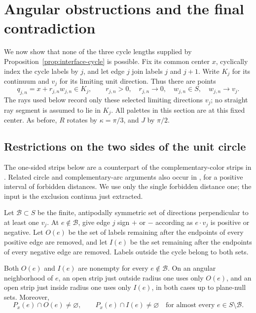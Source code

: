 \section{Angular obstructions and the final contradiction}
\label{sec:angular}

We now show that none of the three cycle lengths supplied by
Proposition~\ref{prop:interface-cycle} is possible.  Fix its common
center \(x\), cyclically index the cycle labels by \(j\), and let
edge \(j\) join labels \(j\) and \(j+1\).  Write \(K_j\) for its
continuum and \(v_j\) for its limiting unit direction.  Thus there
are points
\[
 q_{j,n}=x+r_{j,n}w_{j,n}\in K_j,\qquad
 r_{j,n}>0,\quad r_{j,n}\longrightarrow0,\quad
 w_{j,n}\in S,\quad w_{j,n}\longrightarrow v_j.
\]
The rays used below record only these selected limiting directions
\(v_j\); no straight ray segment is assumed to lie in \(K_j\).
All palettes in this section are at this fixed center.  As before,
\(R\) rotates by \(\kappa=\pi/3\), and \(J\) by \(\pi/2\).

\subsection{Restrictions on the two sides of the unit circle}

The one-sided strips below are a counterpart of the complementary-color
strips in \citet[Proposition~9]{SokolovVoronov2025}. Related circle and
complementary-arc arguments also occur in
\citet[Sections~3--5]{Voronov2025Interval}, for a positive interval of
forbidden distances. We use only the single forbidden distance one;
the input is the exclusion continua just extracted.

Let \(\mathcal B\subset S\) be the finite, antipodally symmetric
set of directions perpendicular to at least one \(v_j\).
At \(e\notin\mathcal B\), give edge \(j\) sign \(+\) or \(-\)
according as \(e\cdot v_j\) is positive or negative.  Let \(O(e)\)
be the set of labels remaining after the endpoints of every positive
edge are removed, and let \(I(e)\) be the set remaining after the
endpoints of every negative edge are removed.  Labels outside the
cycle belong to both sets.

\begin{lemma}\label{lem:angular-strips}
Both \(O(e)\) and \(I(e)\) are nonempty for every
\(e\notin\mathcal B\).  On an angular neighborhood of \(e\), an
open strip just outside radius one uses only \(O(e)\), and an open
strip just inside radius one uses only \(I(e)\), in both cases up
to plane-null sets.  Moreover,
\begin{equation}\label{eq:source-25}
 P_x(e)\cap O(e)\ne\varnothing,
 \qquad P_x(e)\cap I(e)\ne\varnothing
 \quad\text{for almost every }e\in S\setminus\mathcal B.
\end{equation}
\end{lemma}

